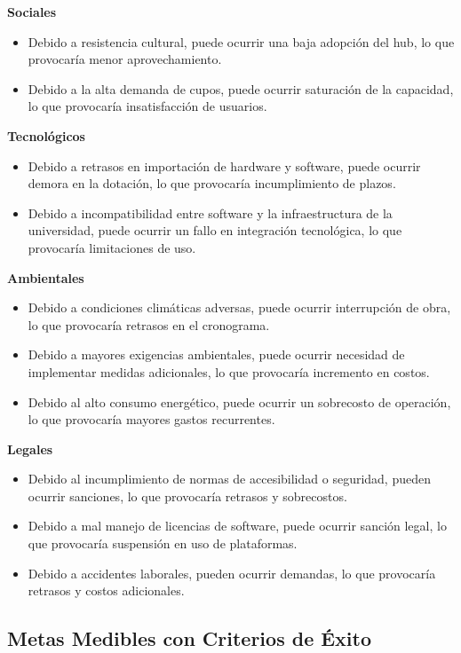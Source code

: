 \textbf{Sociales}
\begin{itemize}
    \item Debido a resistencia cultural, puede ocurrir una baja adopción del hub, lo que provocaría menor aprovechamiento.
    \item Debido a la alta demanda de cupos, puede ocurrir saturación de la capacidad, lo que provocaría insatisfacción de usuarios.
\end{itemize}

\textbf{Tecnológicos}
\begin{itemize}
    \item Debido a retrasos en importación de hardware y software, puede ocurrir demora en la dotación, lo que provocaría incumplimiento de plazos.
    \item Debido a incompatibilidad entre software y la infraestructura de la universidad, puede ocurrir un fallo en integración tecnológica, lo que provocaría limitaciones de uso.
\end{itemize}

\textbf{Ambientales}
\begin{itemize}
    \item Debido a condiciones climáticas adversas, puede ocurrir interrupción de obra, lo que provocaría retrasos en el cronograma.
    \item Debido a mayores exigencias ambientales, puede ocurrir necesidad de implementar medidas adicionales, lo que provocaría incremento en costos.
    \item Debido al alto consumo energético, puede ocurrir un sobrecosto de operación, lo que provocaría mayores gastos recurrentes.
\end{itemize}

\textbf{Legales}
\begin{itemize}
    \item Debido al incumplimiento de normas de accesibilidad o seguridad, pueden ocurrir sanciones, lo que provocaría retrasos y sobrecostos.
    \item Debido a mal manejo de licencias de software, puede ocurrir sanción legal, lo que provocaría suspensión en uso de plataformas.
    \item Debido a accidentes laborales, pueden ocurrir demandas, lo que provocaría retrasos y costos adicionales.
\end{itemize}

\subsection{Metas Medibles con Criterios de Éxito}


